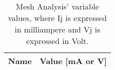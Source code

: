 \begin{table}[h]
  \centering
  \begin{tabular}{|l|r|}
    \hline    
    {\bf Name} & {\bf Value [mA or V]} \\ \hline
    
  \end{tabular}
  \caption{Mesh Analysis' variable values, where Ij is expressed in milliampere and Vj is expressed in Volt.}
  \label{tab:Mesh}
\end{table}







